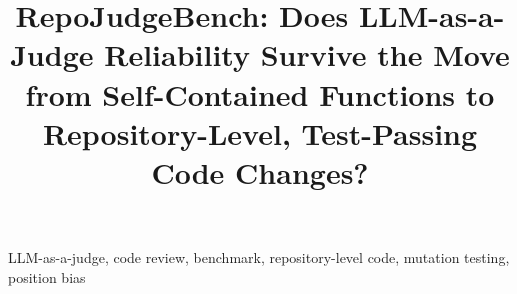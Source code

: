 \documentclass[conference]{IEEEtran}
\begin{document}
\title{RepoJudgeBench: Does LLM-as-a-Judge Reliability Survive the Move from Self-Contained Functions to Repository-Level, Test-Passing Code Changes?}

\author{
\and
{}
}

\maketitle

\begin{abstract}

\end{abstract}

\begin{IEEEkeywords}
LLM-as-a-judge, code review, benchmark, repository-level code, mutation testing, position bias
\end{IEEEkeywords}










\end{document}
